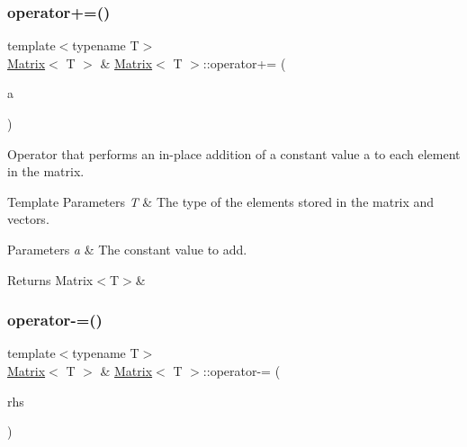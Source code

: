 \subsubsection{\texorpdfstring{operator+=()}{operator+=()}\hspace{0.1cm}{\footnotesize\ttfamily [2/2]}}
{\footnotesize\ttfamily template$<$typename T$>$ \\
\mbox{\hyperlink{classMatrix}{Matrix}}$<$ T $>$ \& \mbox{\hyperlink{classMatrix}{Matrix}}$<$ T $>$\+::operator+= (\begin{DoxyParamCaption}\item[{const T \&}]{a }\end{DoxyParamCaption})\hspace{0.3cm}{\ttfamily [inline]}}



Operator that performs an in-\/place addition of a constant value {\ttfamily a} to each element in the matrix. 


\begin{DoxyTemplParams}{Template Parameters}
{\em T} & The type of the elements stored in the matrix and vectors. \\
\hline
\end{DoxyTemplParams}

\begin{DoxyParams}{Parameters}
{\em a} & The constant value to add. \\
\hline
\end{DoxyParams}
\begin{DoxyReturn}{Returns}
Matrix$<$\+T$>$\& 
\end{DoxyReturn}
\mbox{\label{classMatrix_a50e2998bc90012d77efc0ff39d089336}} 
\subsubsection{\texorpdfstring{operator-\/=()}{operator-=()}\hspace{0.1cm}{\footnotesize\ttfamily [1/2]}}
{\footnotesize\ttfamily template$<$typename T$>$ \\
\mbox{\hyperlink{classMatrix}{Matrix}}$<$ T $>$ \& \mbox{\hyperlink{classMatrix}{Matrix}}$<$ T $>$\+::operator-\/= (\begin{DoxyParamCaption}\item[{const \mbox{\hyperlink{classMatrix}{Matrix}}$<$ T $>$ \&}]{rhs }\end{DoxyParamCaption})\hspace{0.3cm}{\ttfamily [inline]}}



